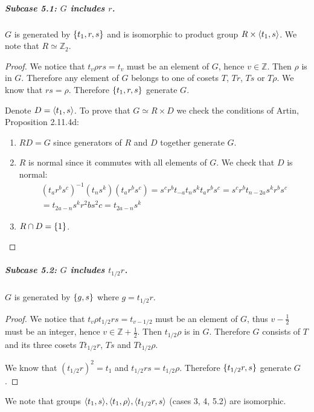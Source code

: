 \documentclass{article}
\theoremstyle{definition}
\newcommand{\Z}{\mathbb{Z}}
\DeclarePairedDelimiter\set{\{}{\}}
\DeclarePairedDelimiter\genby{\langle}{\rangle}
\begin{document}
\subparagraph{Subcase 5.1: $G$ includes $r$.}
$G$ is generated by $\set{t_1,r,s}$ and is isomorphic to product group $R \times \genby{t_1, s}$.
We note that $R \simeq \Z_2$.

\begin{proof}

We notice that $t_v \rho r s = t_v$ must be an element of $G$, hence $v \in \Z$.
Then $\rho$ is in $G$.
Therefore any element of $G$ belongs to one of cosets $T$, $Tr$, $Ts$ or $T\rho$.
We know that $rs = \rho$.
Therefore $\set{t_1, r, s}$ generate $G$.

Denote $D = \genby{t_1, s}$.
To prove that $G \simeq R \times D$ we check the conditions of Artin, Proposition 2.11.4d:

\begin{enumerate}

    \item $RD = G$ since generators of $R$ and $D$ together generate $G$.
    \item $R$ is normal since it commutes with all elements of $G$.
    We check that $D$ is normal:
    \begin{gather*}
        (t_a r^b s^c)^{-1} (t_n s^k) (t_a r^b s^c) 
       = s^c r^b t_{-a} t_n s^k t_a r^b s^c
       = s^c r^b t_{n-2a} s^k r^b s^c \\
       = t_{2a-n} s^k r^2b s^2c
       = t_{2a-n} s^k
    \end{gather*}
    \item $R \cap D = \set{1}$.
    
\end{enumerate}

\end{proof}

\subparagraph{Subcase 5.2: $G$ includes $t_{1/2} r$.}
$G$ is generated by $\set{g, s}$ where $g = t_{1/2}r$.

\begin{proof}

We notice that $t_v \rho t_{1/2} r s = t_{v-1/2}$ must be an element of $G$, thus $v - \frac{1}{2}$ must be an integer, hence $v \in \Z + \frac{1}{2}$.
Then $t_{1/2} \rho$ is in $G$.
Therefore $G$ consists of $T$ and its three cosets $T t_{1/2} r$, $Ts$ and $T t_{1/2} \rho$.

We know that $(t_{1/2} r)^2 = t_1$ and $t_{1/2}rs = t_{1/2}\rho$.
Therefore $\set{t_{1/2}r, s}$ generate $G$.

\end{proof}

We note that groups $\genby{t_1, s}, \genby{t_1, \rho}, \genby{t_{1/2}r, s}$ (cases 3, 4, 5.2) are isomorphic.
\end{document}
